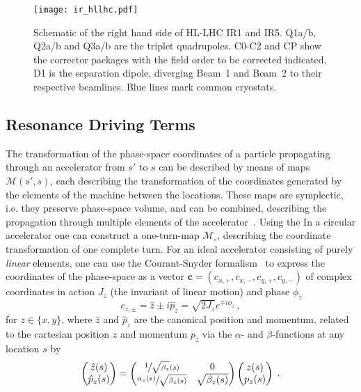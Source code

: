 \begin{figure}[h!]
    \centering
    \texttt{[image: ir\_hllhc.pdf]}
    \caption{Schematic of the right hand side of HL-LHC IR1 and IR5.
    Q1a/b, Q2a/b and Q3a/b are the triplet quadrupoles. 
    C0-C2 and CP show the corrector packages with the field order to be corrected indicated. 
    D1 is the separation dipole, diverging Beam~1 and Beam~2
    to their respective beamlines. 
    Blue lines mark common cryostats. 
    }
    \label{fig:irregionhllhc}
\end{figure}


\subsection{Resonance Driving Terms}

The transformation of the phase-space coordinates of a particle propagating through an accelerator 
from $s'$ to $s$ can be described by means of maps $\mathcal{M}(s', s)$, 
each describing the transformation of the coordinates generated by the elements of the machine between the locations.
These maps are symplectic, i.e. they preserve phase-space volume, and can be combined, describing the propagation 
through multiple elements of the accelerator~\cite{DragtLieSeriesInvariant1976}.
Using the In a circular accelerator one can construct a one-turn-map $\mathcal{M}_\circ $, 
describing the coordinate transformation of one complete turn. 
For an ideal accelerator consisting of purely \textit{linear} elements, 
one can use the Courant-Snyder formalism~\cite{CourantTheoryAlternatinggradientSynchrotron1958} 
to express the coordinates of the phase-space
as a vector $\bm{c} = (c_{x,+}, c_{x,-}, c_{y,+}, c_{y,-})$ of complex coordinates in action $J_z$ (the invariant of linear motion) and phase $\phi_z$
%
\begin{equation}
    \label{eq:CSCoordinates}
    c_{z,\pm} = \hat{z} \pm i\hat{p}_z = \sqrt{2J_z}e^{\mp i \phi_z} \, ,
\end{equation}
%
for $z \in \{x, y\}$, where $\hat{z}$ and $\hat{p}_z$ are the canonical position and momentum, 
related to the cartesian position $z$ and momentum $p_z$ via the $\alpha$- and 
$\beta$-functions at any location $s$ by 
%
\begin{equation}
    \begin{pmatrix}\hat{z}(s) \\ \hat{p}_z(s) \end{pmatrix} = 
    \begin{pmatrix} \sfrac{1}{\sqrt{\beta_z}(s)} & 0 \\ \sfrac{\alpha_z(s)}{\sqrt{\beta_z(s)}} & \sqrt{\beta_z(s)}\end{pmatrix}
    \begin{pmatrix}z(s) \\ p_z(s)\end{pmatrix}
    \;.
\end{equation}

